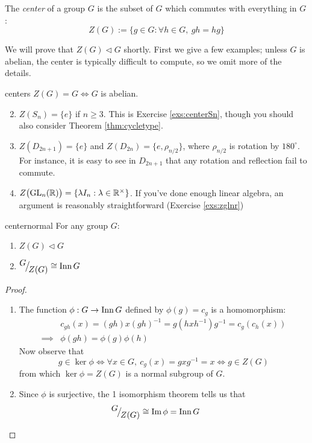 \begin{defn}{}{}
The \emph{center} of a group $G$ is the subset of $G$ which commutes with everything in $G$:
\[Z(G):=\{g\in G:\forall h\in G,\ gh=hg\}\]
\end{defn}

We will prove that $Z(G)\triangleleft G$ shortly. First we give a few examples; unless $G$ is abelian, the center is typically difficult to compute, so we omit more of the details.


\begin{examples}{}{centers}
\exstart $Z(G)=G\iff G$ is abelian.
\begin{enumerate}\setcounter{enumi}{1}
  \item $Z(S_n)=\{e\}$ if $n\ge 3$. This is Exercise \ref{exs:centerSn}, though you should also consider Theorem \ref{thm:cycletype}.
  \item $Z(D_{2n+1})=\{e\}$ and $Z(D_{2n})=\{e,\rho_{n/2}\}$, where $\rho_{n/2}$ is rotation by $180^\circ$. For instance, it is easy to see in $D_{2n+1}$ that any rotation and reflection fail to commute.
  \item $Z\bigl(\mathrm{GL}_n(\mathbb{R})\bigr)=\{\lambda I_n:\lambda\in\mathbb{R}^\times\}$. If you've done enough linear algebra, an argument is reasonably straightforward (Exercise \ref{exs:zglnr})
\end{enumerate}
\end{examples}

\begin{thm}{}{centernormal}
For any group $G$:
\begin{enumerate}
  \item $Z(G)\triangleleft G$
  \item ${}^{\textstyle {G}}\!\big/_{\textstyle \!{Z(G)}}\cong \operatorname{Inn} G$
\end{enumerate}
\end{thm}

\begin{proof}
\begin{enumerate}
  \item The function $\phi:G\to\operatorname{Inn} G$ defined by $\phi(g)=c_g$ is a homomorphism:
	\begin{align*}
		&c_{gh}(x)=(gh)x(gh)^{-1}=g(hxh^{-1})g^{-1}=c_g(c_h(x))\\
		\implies &\phi(gh)=\phi(g)\phi(h)
	\end{align*}
	Now observe that
	\[
		g\in\ker\phi\iff \forall x\in G,\ c_g(x)=gxg^{-1}=x\iff g\in Z(G)
	\]
	from which $\ker\phi=Z(G)$ is a normal subgroup of $G$.
	\item Since $\phi$ is surjective, the 1\st{} isomorphism theorem tells us that
\[{}^{\textstyle {G}}\!\big/_{\textstyle \!{Z(G)}}\cong\operatorname{Im}\phi=\operatorname{Inn} G\tag*{\qedhere}\]
\end{enumerate}
\end{proof}

